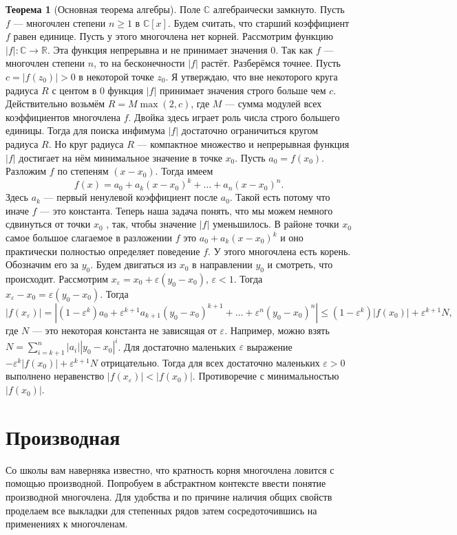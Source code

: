 \documentclass[10pt,a4paper,oneside]{book}
\theoremstyle{definition}
\newtheorem*{thmm}{Теорема}
\newcommand{\mb}[1]{\mathbb{#1}}
\def\eps{\varepsilon}
\begin{document}
\begin{thmm}[Основная теорема алгебры] Поле $\mb C$ алгебраически замкнуто.
\proof Пусть $f$ — многочлен степени $n\geq 1$ в $\mb C[x]$. Будем считать, что старший коэффициент $f$ равен единице. Пусть у этого многочлена нет корней. Рассмотрим функцию $|f|\colon \mb C \to \mb R$. Эта функция непрерывна и не принимает значения 0. Так как $f$ --- многочлен степени $n$, то на бесконечности $|f|$ растёт. Разберёмся точнее. Пусть
$c = |f(z_0)| > 0$ в некоторой точке $z_0$. Я утверждаю, что вне некоторого круга радиуса $R$ с центом в 0 функция
$|f|$ принимает значения строго больше чем $c$. Действительно возьмём $R= M \max(2,c)$, где $M$ --- сумма модулей всех коэффициентов многочлена $f$. Двойка здесь играет роль числа строго большего единицы.
Тогда для поиска инфимума $|f|$ достаточно ограничиться кругом радиуса $R$. Но круг радиуса $R$ --- компактное множество и непрерывная функция $|f|$ достигает на нём минимальное значение в точке $x_0$. Пусть $a_0 =f(x_0)$. Разложим
$f$ по степеням $(x-x_0)$. Тогда имеем
$$f(x) = a_0 + a_k (x-x_0)^k + \dots + a_n(x -x_0 )^n.$$
Здесь $a_k$ --- первый ненулевой коэффициент после $a_0$. Такой есть потому что иначе $f$ --- это константа. Теперь наша
задача понять, что мы можем немного сдвинуться от точки $x_0$ , так, чтобы значение $|f|$ уменьшилось. В районе точки
$x_0$ самое большое слагаемое в разложении $f$ это $a_0 + a_k (x-x_0)^k$ и оно практически полностью определяет поведение $f$.
У этого многочлена есть корень. Обозначим его за $y_0$. Будем двигаться из $x_0$ в направлении $y_0$ и смотреть, что происходит.
Рассмотрим $x_{\eps} = x_0 + \eps(y_0 -x_0 ), \,\eps < 1$. Тогда $x_{\eps} -x_0 = \eps(y_0 -x_0 )$. Тогда
$$|f(x_{\eps})| = |(1 - \eps^k)a_0 + \eps^{k+1} a_{k+1} (y_0 -x_0)^{k+1} + \dots+ \eps^n(y_0-x_0 )^n | \leq (1- \eps^k )|f(x_0)| + \eps^{k+1}N,$$
где $N$ — это некоторая константа не зависящая от $\eps$. Например, можно взять $N = \sum_{i=k+1}^n |a_i||y_0 -x_0 |^i$. Для достаточно
маленьких $\eps$ выражение $ -\eps^k |f(x_0)| + \eps^{k+1}N$ отрицательно. Тогда для всех достаточно маленьких $\eps>0$ выполнено неравенство $|f(x_{\eps})| < |f(x_0)|$.
Противоречие с минимальностью $|f(x_0)|$. \endproof
\end{thmm}






\section{Производная}
Со школы вам наверняка известно, что кратность корня многочлена ловится с помощью производной. Попробуем в абстрактном
контексте ввести понятие производной многочлена. Для удобства и по причине наличия общих свойств проделаем все выкладки для степенных рядов затем сосредоточившись на применениях к многочленам.
\end{document}
